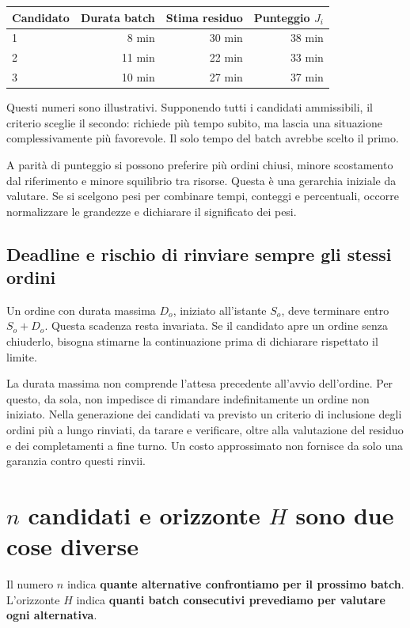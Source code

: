 \documentclass[a4paper,11pt]{article}
\begin{document}
\begin{center}
\begin{tabular}{lrrr}
\toprule
Candidato & Durata batch & Stima residuo & Punteggio $J_i$\\
\midrule
1 & 8 min & 30 min & 38 min\\
2 & 11 min & 22 min & 33 min\\
3 & 10 min & 27 min & 37 min\\
\bottomrule
\end{tabular}
\end{center}

Questi numeri sono illustrativi. Supponendo tutti i candidati ammissibili, il criterio sceglie il secondo: richiede più tempo subito, ma lascia una situazione complessivamente più favorevole. Il solo tempo del batch avrebbe scelto il primo.

A parità di punteggio si possono preferire più ordini chiusi, minore scostamento dal riferimento e minore squilibrio tra risorse. Questa è una gerarchia iniziale da valutare. Se si scelgono pesi per combinare tempi, conteggi e percentuali, occorre normalizzare le grandezze e dichiarare il significato dei pesi.

\subsection*{Deadline e rischio di rinviare sempre gli stessi ordini}

Un ordine con durata massima $D_o$, iniziato all'istante $S_o$, deve terminare entro $S_o+D_o$. Questa scadenza resta invariata. Se il candidato apre un ordine senza chiuderlo, bisogna stimarne la continuazione prima di dichiarare rispettato il limite.

La durata massima non comprende l'attesa precedente all'avvio dell'ordine. Per questo, da sola, non impedisce di rimandare indefinitamente un ordine non iniziato. Nella generazione dei candidati va previsto un criterio di inclusione degli ordini più a lungo rinviati, da tarare e verificare, oltre alla valutazione del residuo e dei completamenti a fine turno. Un costo approssimato non fornisce da solo una garanzia contro questi rinvii.

\section{$n$ candidati e orizzonte $H$ sono due cose diverse}

Il numero $n$ indica \textbf{quante alternative confrontiamo per il prossimo batch}. L'orizzonte $H$ indica \textbf{quanti batch consecutivi prevediamo per valutare ogni alternativa}.
\end{document}
